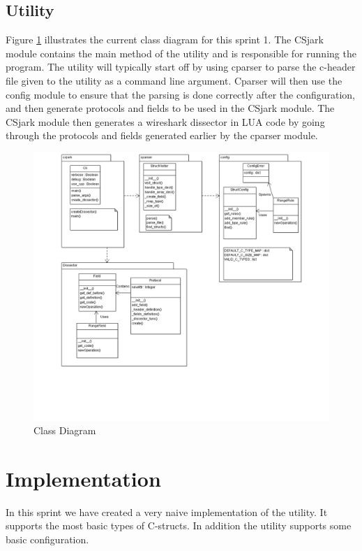 \subsection{Utility}
Figure \ref{fig:sp1_class} illustrates the current class diagram for this sprint 1. The CSjark module contains the main method of the utility and is responsible for running the program. The utility will typically start off by using cparser to parse the c-header file given to the utility as a command line argument. Cparser will then use the config module to ensure that the parsing is done correctly after the configuration, and then generate protocols and fields to be used in the CSjark module. The CSjark module then generates a wireshark dissector in LUA code by going through the protocols and fields generated earlier by the cparser module. 

\begin{figure}[here]
\includegraphics[scale=0.4]{./sprints/img/class_diagram_s1.png}
\caption{Class Diagram}
\label{fig:sp1_class}
\end{figure}

\section{Implementation}

In this sprint we have created a very naive implementation of the utility. It supports the most basic types of C-structs. In addition the utility supports some basic configuration.

